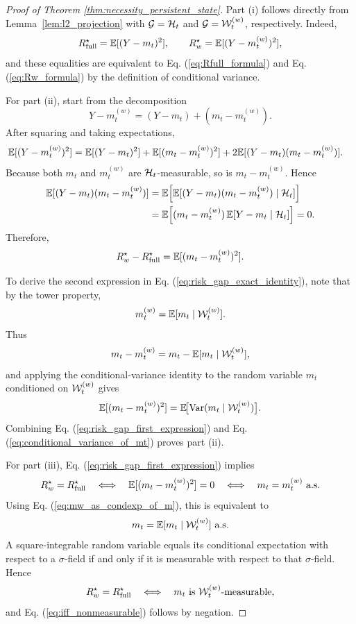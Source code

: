 \begin{proof}[Proof of Theorem \ref{thm:necessity_persistent_state}]
Part \textup{(i)} follows directly from Lemma~\ref{lem:l2_projection} with $\mathcal G=\mathcal{H}_t$ and $\mathcal G=\mathcal{W}_t^{(w)}$, respectively. Indeed,
\[
R_{\mathrm{full}}^\star = \mathbb{E}[(Y-m_t)^2],
\qquad
R_w^\star = \mathbb{E}[(Y-m_t^{(w)})^2],
\]
and these equalities are equivalent to Eq. (\ref{eq:Rfull_formula}) and Eq. (\ref{eq:Rw_formula}) by the definition of conditional variance.

For part \textup{(ii)}, start from the decomposition
\begin{equation}
Y - m_t^{(w)}
=
(Y-m_t) + (m_t-m_t^{(w)}).
\label{eq:risk_gap_decomposition}
\end{equation}
After squaring and taking expectations,
\begin{align}
\mathbb{E}[(Y-m_t^{(w)})^2]
&=
\mathbb{E}[(Y-m_t)^2]
+
\mathbb{E}[(m_t-m_t^{(w)})^2]
+
2\mathbb{E}[(Y-m_t)(m_t-m_t^{(w)})].
\label{eq:risk_gap_expand}
\end{align}
Because both $m_t$ and $m_t^{(w)}$ are $\mathcal{H}_t$-measurable, so is $m_t-m_t^{(w)}$. Hence
\begin{align}
\mathbb{E}[(Y-m_t)(m_t-m_t^{(w)})]
&=
\mathbb{E}\Bigl[
\mathbb{E}[(Y-m_t)(m_t-m_t^{(w)})\mid \mathcal{H}_t]
\Bigr]
\nonumber\\
&=
\mathbb{E}\Bigl[
(m_t-m_t^{(w)})\,\mathbb{E}[Y-m_t\mid \mathcal{H}_t]
\Bigr]
=
0.
\end{align}
Therefore,
\begin{equation}
R_w^\star - R_{\mathrm{full}}^\star
=
\mathbb{E}[(m_t-m_t^{(w)})^2].
\label{eq:risk_gap_first_expression}
\end{equation}

To derive the second expression in Eq. (\ref{eq:risk_gap_exact_identity}), note that by the tower property,
\begin{equation}
m_t^{(w)} = \mathbb{E}[m_t\mid \mathcal{W}_t^{(w)}].
\label{eq:mw_as_condexp_of_m}
\end{equation}
Thus
\[
m_t - m_t^{(w)}
=
m_t - \mathbb{E}[m_t\mid \mathcal{W}_t^{(w)}],
\]
and applying the conditional-variance identity to the random variable $m_t$ conditioned on $\mathcal{W}_t^{(w)}$ gives
\begin{equation}
\mathbb{E}[(m_t-m_t^{(w)})^2]
=
\mathbb{E}\!\bigl[\operatorname{Var}(m_t\mid \mathcal{W}_t^{(w)})\bigr].
\label{eq:conditional_variance_of_mt}
\end{equation}
Combining Eq. (\ref{eq:risk_gap_first_expression}) and Eq. (\ref{eq:conditional_variance_of_mt}) proves part \textup{(ii)}.

For part \textup{(iii)}, Eq. (\ref{eq:risk_gap_first_expression}) implies
\[
R_w^\star = R_{\mathrm{full}}^\star
\quad\Longleftrightarrow\quad
\mathbb{E}[(m_t-m_t^{(w)})^2]=0
\quad\Longleftrightarrow\quad
m_t = m_t^{(w)} \ \text{a.s.}
\]
Using Eq. (\ref{eq:mw_as_condexp_of_m}), this is equivalent to
\[
m_t = \mathbb{E}[m_t\mid \mathcal{W}_t^{(w)}] \ \text{a.s.}
\]
A square-integrable random variable equals its conditional expectation with respect to a $\sigma$-field if and only if it is measurable with respect to that $\sigma$-field. Hence
\[
R_w^\star = R_{\mathrm{full}}^\star
\quad\Longleftrightarrow\quad
m_t \text{ is } \mathcal{W}_t^{(w)}\text{-measurable},
\]
and Eq. (\ref{eq:iff_nonmeasurable}) follows by negation.
\end{proof}
